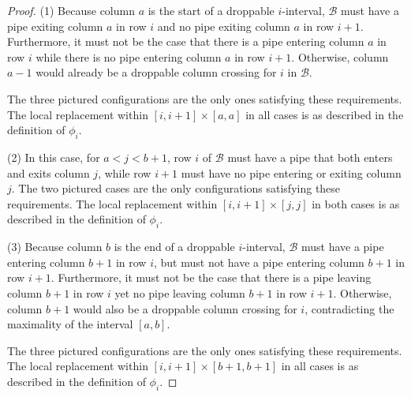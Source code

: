 \documentclass[12 pt]{amsart}
\numberwithin{equation}{section}
\theoremstyle{remark}
\begin{document}
\begin{proof}
    \noindent (1) Because column $a$ is the start of a droppable $i$-interval, $\mathcal{B}$ must have a pipe exiting column $a$ in row $i$ and no pipe exiting column $a$ in row $i+1$. Furthermore, it must not be the case that there is a pipe entering column $a$ in row $i$ while there is no pipe entering column $a$ in row $i+1$. Otherwise, column $a-1$ would already be a droppable column crossing for $i$ in $\mathcal B$.
    
    The three pictured configurations are the only ones satisfying these requirements. The local replacement within $[i,i+1]\times [a,a]$ in all cases is as described in the definition of $\phi_i$.

        \noindent (2) In this case, for $a < j < b+1$, row $i$ of $\mathcal B$ must have a pipe that both enters and exits column $j$, while row $i+1$ must have no pipe entering or exiting column $j$. The two pictured cases  are the only configurations satisfying these requirements. The local replacement within $[i,i+1]\times [j,j]$ in both cases is as described in the definition of $\phi_i$.

    \noindent (3) Because column $b$ is the end of a droppable $i$-interval, $\mathcal{B}$ must have a pipe entering column $b+1$ in row $i$, but must not have a pipe entering column $b+1$ in row $i+1$. Furthermore, it must not be the case that there is a pipe leaving column $b+1$ in row $i$ yet no pipe leaving column $b+1$ in row $i+1$. Otherwise, column $b+1$ would also be a droppable column crossing for $i$, contradicting the maximality of the interval $[a,b]$.

    The three pictured configurations are the only ones satisfying these requirements. The local replacement within $[i,i+1]\times [b+1,b+1]$ in all cases is as described in the definition of $\phi_i$.
\end{proof}
\end{document}

